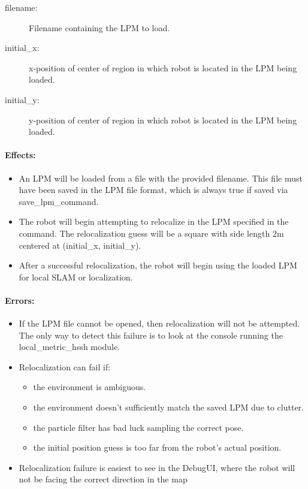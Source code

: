 \documentclass{article}
\begin{document}
\begin{description}
 \item[filename:] Filename containing the LPM to load.
 \item[initial\_x:] x-position of center of region in which robot is located in the LPM being loaded.
 \item[initial\_y:] y-position of center of region in which robot is located in the LPM being loaded.
\end{description}


\paragraph{Effects:}

\begin{itemize}
  \item An LPM will be loaded from a file with the provided filename. This file must have been saved in the LPM 
file format, which is always true if saved via save\_lpm\_command.
  \item The robot will begin attempting to relocalize in the LPM specified in the command. The relocalization guess 
will be a square with side length 2m centered at (initial\_x, initial\_y).
  \item After a successful relocalization, the robot will begin using the loaded LPM for local SLAM or localization.
\end{itemize}

\paragraph{Errors:}

\begin{itemize}
  \item If the LPM file cannot be opened, then relocalization will not be attempted. The only way to detect this 
failure is to look at the console running the local\_metric\_hssh module.
  \item Relocalization can fail if:
    \begin{itemize}
      \item the environment is ambiguous.
      \item the environment doesn't sufficiently match the saved LPM due to clutter.
      \item the particle filter has bad luck sampling the correct pose.
      \item the initial position guess is too far from the robot's actual position.
    \end{itemize}
      
  \item Relocalization failure is easiest to see in the DebugUI, where the robot will not be facing the correct 
direction in the map
\end{itemize}
\end{document}
